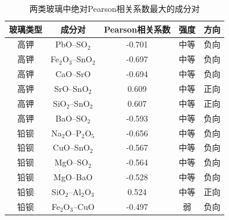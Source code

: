 \begin{table}[H]
  \centering
  \caption{两类玻璃中绝对Pearson相关系数最大的成分对}
  \label{tab:p4-high-correlations}
  \small
  \begin{tabular}{ccccc}
    \toprule
    玻璃类型 & 成分对 & Pearson相关系数 & 强度 & 方向 \\
    \midrule
    高钾 & PbO--SO$_2$ & -0.701 & 中等 & 负向 \\
    高钾 & Fe$_2$O$_3$--SnO$_2$ & -0.697 & 中等 & 负向 \\
    高钾 & CaO--SrO & -0.694 & 中等 & 负向 \\
    高钾 & SrO--SnO$_2$ & 0.609 & 中等 & 正向 \\
    高钾 & SiO$_2$--SnO$_2$ & 0.607 & 中等 & 正向 \\
    高钾 & BaO--SO$_2$ & -0.593 & 中等 & 负向 \\
    铅钡 & Na$_2$O--P$_2$O$_5$ & -0.656 & 中等 & 负向 \\
    铅钡 & CuO--SnO$_2$ & -0.567 & 中等 & 负向 \\
    铅钡 & MgO--SO$_2$ & -0.564 & 中等 & 负向 \\
    铅钡 & MgO--BaO & -0.528 & 中等 & 负向 \\
    铅钡 & SiO$_2$--Al$_2$O$_3$ & 0.524 & 中等 & 正向 \\
    铅钡 & Fe$_2$O$_3$--CuO & -0.497 & 弱 & 负向 \\
    \bottomrule
  \end{tabular}
\end{table}

